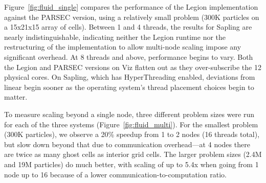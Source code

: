 Figure~\ref{fig:fluid_single} compares the performance of the Legion
implementation against the PARSEC version, using a relatively small
problem (300K particles on a 15x21x15 array of cells).  Between 1 and
4 threads, the results for Sapling are nearly indistinguishable,
indicating neither the Legion runtime nor the restructuring of the
implementation to allow multi-node scaling impose any significant
overhead.
At 8 threads and above, performance begins to vary.  Both the Legion
and PARSEC versions on Viz flatten out as they over-subscribe the 12
physical cores.  On Sapling, which has HyperThreading enabled,
deviations from linear begin sooner as the operating system's
thread placement choices begin to matter.

To measure scaling beyond a single node, three different problem sizes
were run for each of the three systems (Figure~\ref{fig:fluid_multi}).
For the smallest problem (300K particles), we observe a 20\% speedup
from 1 to 2 nodes (16 threads total), but slow
down beyond that due to communication overhead---at 4 nodes there are
twice as many ghost cells as interior grid cells.  The larger problem
sizes (2.4M and 19M particles) do much better, with scaling of up to
5.4x when going from 1 node up to 16 because of a lower
communication-to-computation ratio.


